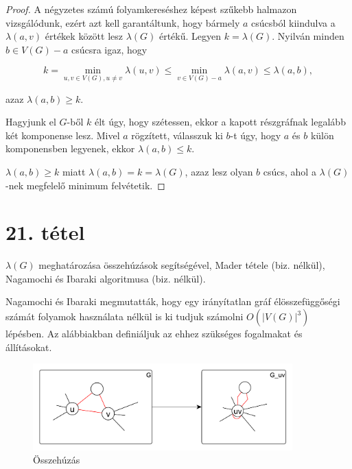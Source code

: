\documentclass{article}
\theoremstyle{definition}
\begin{document}
\begin{proof} A négyzetes számú folyamkereséshez képest szűkebb halmazon vizsgálódunk, ezért azt kell garantáltunk, hogy bármely $a$ csúcsból kiindulva a $\lambda(a, v)$ értékek között lesz $\lambda(G)$ értékű. Legyen $k=\lambda(G)$. Nyilván minden $b \in V(G)-a$ csúcsra igaz, hogy 

\[ k = \min_{u, v \in V(G), u \neq v} \lambda(u, v) \leq \min_{v \in V(G)-a} \lambda(a, v) \leq \lambda(a, b), \]

azaz $\lambda(a, b) \geq k$.

Hagyjunk el $G$-ből $k$ élt úgy, hogy szétessen, ekkor a kapott részgráfnak legalább két komponense lesz. Mivel $a$ rögzített, válasszuk ki $b$-t úgy, hogy $a$ és $b$ külön komponensben legyenek, ekkor $\lambda(a, b) \leq k$.

$\lambda(a, b) \geq k$ miatt $\lambda(a,b) = k = \lambda(G)$, azaz lesz olyan $b$ csúcs, ahol a $\lambda(G)$-nek megfelelő minimum felvétetik.

\end{proof}


\section*{21. tétel}
\begin{framed}
$\lambda(G)$ meghatározása összehúzások segítségével, Mader tétele (biz. nélkül), Nagamochi és Ibaraki algoritmusa (biz. nélkül).
\end{framed}

Nagamochi és Ibaraki megmutatták, hogy egy irányítatlan gráf élösszefüggőségi számát folyamok használata nélkül is ki tudjuk számolni $O(|V(G)|^3)$ lépésben. Az alábbiakban definiáljuk az ehhez szükséges fogalmakat és állításokat.

\begin{figure}
\centering
\includegraphics[width=100mm,keepaspectratio]{figures/osszehuzas.pdf}
\caption{Összehúzás}
\label{fig:osszehuzas}
\end{figure}
\end{document}
